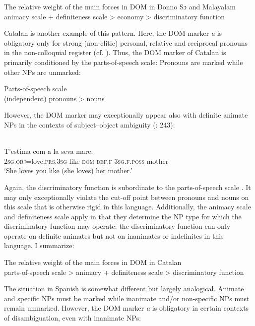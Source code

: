 \documentclass[output=paper]{langsci/langscibook}
\begin{document}
\ea\label{ex:serzant:12}
The relative weight of the main forces in DOM in Donno Sɔ and Malayalam\\
animacy scale + definiteness scale > economy > discriminatory function\\
\z

Catalan is another example of this pattern. Here, the DOM marker \textit{a} is obligatory only for strong (non-clitic) personal, relative and reciprocal pronouns in the non-colloquial register (cf. \citealt{Escandell-Vidal2009}). Thus, the DOM marker of Catalan is primarily conditioned by the parts-of-speech scale: Pronouns are marked while other NPs are unmarked: 

\ea\label{ex:serzant:13}
Parts-of-speech scale\\
(independent) pronouns > nouns\\
\z

However, the DOM marker may exceptionally appear also with definite animate NPs in the contexts of subject–object ambiguity (\citealt{WheelerEtAl1999}: 243):

\ea\label{ex:serzant:14}
\\
\gll T’estima     com a     la   seva     mare.\\
     \textsc{2sg.obj}=love.\textsc{prs.3sg} like \textsc{dom}   \textsc{def.f}   \textsc{3sg.f.poss}   mother\\
\glt ‘She loves you like (she loves) her mother.’
\z

Again, the discriminatory function is subordinate to the parts-of-speech scale . It may only exceptionally violate the cut-off point between pronouns and nouns on this scale that is otherwise rigid in this language. Additionally, the animacy scale  and definiteness scale  apply in that they determine the NP type for which the discriminatory function may operate: the discriminatory function can only operate on definite animates but not on inanimates or indefinites in this language. I summarize:

\ea\label{ex:serzant:15}
The relative weight of the main forces in DOM in Catalan\\
parts-of-speech scale > animacy + definiteness scale > discriminatory function
\z

The situation in Spanish is somewhat different but largely analogical. Animate and specific NPs must be marked while inanimate and/or non-specific NPs must remain unmarked. However, the DOM marker \textit{a} is obligatory in certain contexts of disambiguation, even with inanimate NPs:
\end{document}
